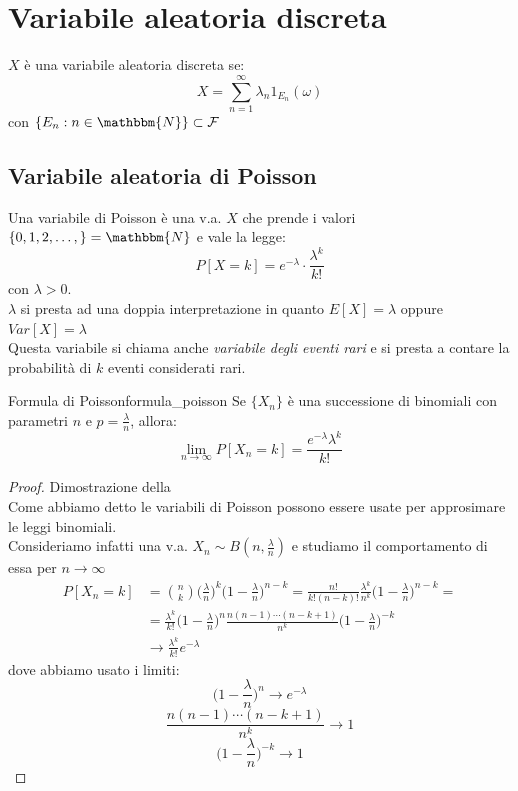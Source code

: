 \documentclass[12pt]{report}
\newcounter{theorem}
\newcommand{\namerefl}[1]{%
	\bgroup
	\let\nmu\MakeLowercase
	\nameref{#1}\egroup}
\newcommand{\nmu}{}
\begin{document}
  	\section{Variabile aleatoria discreta}
  	$X$ è una variabile aleatoria discreta se:
  	\[
  	X = \sum_{n=1}^{\infty}\lambda_n1_{E_n}(\omega)
  	\]
  	con $\{E_n: n \in \mathbbm{N}\} \subset \mathcal{F}$
  	\subsection{Variabile aleatoria di Poisson}
  	Una variabile di Poisson è una v.a. $X$ che prende i valori $\{0, 1, 2, \dots, \} = \mathbbm{N}$ e vale la legge:
  	\[
  	P[X = k] = e^{-\lambda}\cdot \frac{\lambda^k}{k!}
  	\]
  	con $\lambda > 0$. \\
  	$\lambda$ si presta ad una doppia interpretazione in quanto $E[X] = \lambda$ oppure $Var[X] = \lambda$ \\
  	Questa variabile si chiama anche \textit{variabile degli eventi rari} e si presta a contare la probabilità di $k$ eventi considerati rari.
  	\begin{theorem}{\nmu Formula di Poisson}{formula_poisson}
  	Se $\{X_n\}$ è una successione di binomiali con parametri $n$ e $p = \frac{\lambda}{n}$, allora:
  	\[
  	\lim_{n \to \infty}P[X_n = k] = \frac{e^{-\lambda}\lambda^k}{k!}
  	\]
  	 \end{theorem}
  	 \begin{proof}{\nmu Dimostrazione della \namerefl{th:formula_poisson}} \quad \\
  	 	Come abbiamo detto le variabili di Poisson possono essere usate per approsimare le leggi binomiali. \\
  	 	Consideriamo infatti una v.a. $X_n \sim B(n, \frac{\lambda}{n})$ e studiamo il comportamento di essa per $n \to \infty$
  	 	\begin{align*}
  	 		P[X_n = k] &= \binom{n}{k}\Bigg(\frac{\lambda}{n}\Bigg)^k\Bigg(1-\frac{\lambda}{n}\Bigg)^{n-k}=\frac{n!}{k!(n-k)!}\frac{\lambda^k}{n^k}\Bigg(1 - \frac{\lambda}{n}\Bigg)^{n-k} = \\
  	 		&= \frac{\lambda^k}{k!}\Bigg(1-\frac{\lambda}{n}\Bigg)^n\frac{n(n-1)\cdots(n-k+1)}{n^k}\Bigg(1-\frac{\lambda}{n}\Bigg)^{-k} \\
  	 		&\to \frac{\lambda^k}{k!}e^{-\lambda}
  	 	\end{align*}
  	 	dove abbiamo usato i limiti:
  	 	\[
  	 	\Bigg(1 - \frac{\lambda}{n}\Bigg)^n \to e^{-\lambda}
  	 	\]
  	 	\[
  	 	\frac{n(n-1)\cdots (n-k+1)}{n^k} \to 1
  	 	\]
  	 	\[
  	 	\Bigg(1-\frac{\lambda}{n}\Bigg)^{-k} \to 1
  	 	\]
  	 \end{proof}
\end{document}
